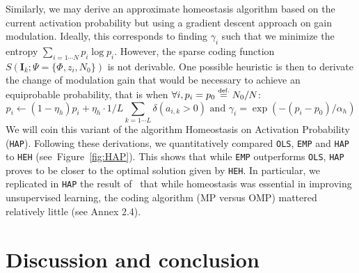 \documentclass[draft]{article} %
\newcommand{\image}{\mathbf{I}} %
\newcommand{\dico}{\Phi} %
\newcommand{\eqdef}{\ensuremath{\stackrel{\mbox{\upshape\tiny def.}}{=}}}
\newcommand{\seeFig}[1]{Figure~\ref{fig:#1}}%
\begin{document}
Similarly, we may derive an approximate homeostasis algorithm based on the current activation probability but using a gradient descent approach on gain modulation. Ideally, this corresponds to finding $\gamma_i$ such that we minimize the entropy $\sum_{i=1\cdots N} p_i \log p_i$. However, the sparse coding function $S(\image_k; \Psi=\{\dico, z_i, N_0\})$ is not derivable. %
One possible heuristic is then to derivate the change of modulation gain that would be necessary to achieve an equiprobable probability, that is when $\forall i, p_i = p_0 \eqdef N_0 / N$: %
\begin{equation}%
p_i \leftarrow (1- \eta_h ) p_i + \eta_h \cdot 1/L\sum_{k=1\cdots L} \delta(a_{i, k} > 0) \textrm{ and }
\gamma_i = \exp(-(p_i - p_0) / \alpha_h)
\end{equation}%
We will coin this variant of the algorithm Homeostasis on Activation Probability (\texttt{HAP}). %
Following these derivations, we quantitatively compared \texttt{OLS}, \texttt{EMP} and \texttt{HAP} to \texttt{HEH} (see~\seeFig{HAP}). This shows that while \texttt{EMP} outperforms \texttt{OLS}, \texttt{HAP} proves to be closer to the optimal solution given by \texttt{HEH}.
In particular, we replicated in \texttt{HAP} the result of~\citet{Sandin17} that while homeostasis was essential in improving unsupervised learning, the coding algorithm (MP versus OMP) mattered relatively little (see Annex 2.4). %
\section{Discussion and conclusion}\label{discussion-et-conclusion}
%
%
\end{document}
